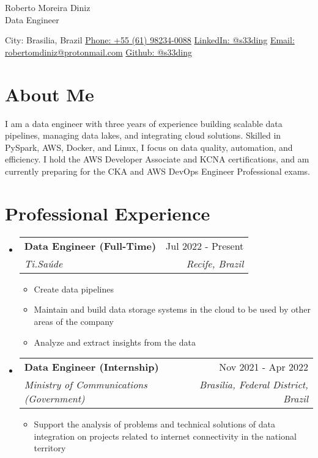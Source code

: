 \documentclass[letterpaper,11pt]{article}%
\makeatletter
\newcommand{\resumeItem}[1]{\item{#1 \vspace{-3pt}}}%
\newcommand{\resumeSubheading}[4]{\vspace{-1pt}\item\begin{tabular*}{0.97\textwidth}[t]{l@{\extracolsep{\fill}}r}\textbf{#1} & #2 \\\textit{\small #3} & \textit{\small #4} \\\end{tabular*}\vspace{-8pt}}%
\newcommand{\resumeSubHeadingListStart}{\begin{itemize}[leftmargin=0.15in, label={}, itemsep=0pt, parsep=0pt]}%
\newcommand{\resumeSubHeadingListEnd}{\end{itemize}}%
\newcommand{\resumeItemListStart}{\begin{itemize}[itemsep=0pt, parsep=0pt]}%
\newcommand{\resumeItemListEnd}{\end{itemize}\vspace{-1pt}}%
\makeatother
\begin{document}
%
\normalsize%
\section*{}%
\label{sec:}%
\begin{center}%
{\LARGE Roberto Moreira Diniz} \\ \vspace{5pt}%
{\large Data Engineer} \\ \vspace{5pt}%
\end{center}%
\begin{center}%
City: Brasilia, Brazil \quad \textbullet \quad \href{https://wa.me/qr/UYOUX2DZ7BYHI1}{Phone: +55 (61) 98234-0088} \quad \textbullet \quad \href{https://www.linkedin.com/in/s33ding/}{LinkedIn: @s33ding} \quad \textbullet \quad \href{mailto:robertomdiniz@protonmail.com}{Email: robertomdiniz@protonmail.com} \quad \textbullet \quad \href{https://github.com/s33ding}{Github: @s33ding}%
\end{center}

%
\section*{About Me}%
\label{sec:AboutMe}%
I am a data engineer with three years of experience building scalable data pipelines, managing data lakes, and integrating cloud solutions. Skilled in PySpark, AWS, Docker, and Linux, I focus on data quality, automation, and efficiency. I hold the AWS Developer Associate and KCNA certifications, and am currently preparing for the CKA and AWS DevOps Engineer Professional exams.

%
\section*{Professional Experience}%
\label{sec:ProfessionalExperience}%
\resumeSubHeadingListStart%
\resumeSubheading{Data Engineer (Full-Time)}{Jul 2022 - Present}{Ti.Saúde}{Recife, Brazil}%
\resumeItemListStart%
\resumeItem{Create data pipelines}%
\resumeItem{Maintain and build data storage systems in the cloud to be used by other areas of the company}%
\resumeItem{Analyze and extract insights from the data}%
\resumeItemListEnd%
\resumeSubheading{Data Engineer (Internship)}{Nov 2021 - Apr 2022}{Ministry of Communications (Government)}{Brasilia, Federal District, Brazil}%
\resumeItemListStart%
\resumeItem{Support the analysis of problems and technical solutions of data integration on projects related to internet connectivity in the national territory}%
\resumeItemListEnd%
\resumeSubHeadingListEnd
\end{document}
